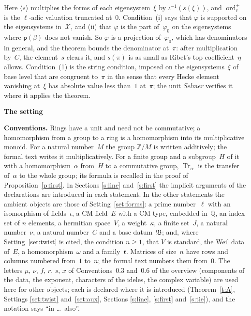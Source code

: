 \documentclass[11pt,a4paper]{article}
\newcommand{\m}[1]{\mbox{$#1$}}        %
\newcommand{\sect}[2]{\refstepcounter{section}\label{#2}\par\addvspace{19pt plus 4pt minus 2pt}\Needspace{7\baselineskip}%
  \noindent\llap{{\fontsize{13.2}{16}\selectfont\bfseries\color{inkfaint}\thesection}\hspace{9pt}}%
  {\fontsize{13.2}{16}\selectfont\bfseries\color{ink}#1}\par\nopagebreak\vspace{-1pt}}
\theoremstyle{plainx}
\theoremstyle{uprightx}
\newenvironment{conventions}{\par\addvspace{5pt}\noindent\textbf{Conventions.}\enspace\ignorespaces}{\par\addvspace{3pt}}
\newcommand{\ZZ}{\mathbb{Z}}
\newcommand{\Qbar}{\bar{\mathbb{Q}}}
\newcommand{\Tr}{\operatorname{Tr}}
\newcommand{\dg}[1]{\langle #1\rangle}
\newcommand{\ordp}{\operatorname{ord}^{+}_{\ell}}
\newcommand{\fB}{\mathfrak{B}}
\newcommand{\rr}{\mathfrak{r}}
\newcommand{\cX}{\mathcal{X}}
\begin{document}
Here \m{\dg{s}} multiplies the forms of each eigensystem~$\xi$ by \m{\iota^{-1}(s(\xi))}, and \m{\ordp} is the
$\ell$-adic valuation truncated at~$0$. Condition~(i) says that $\varphi$ is supported on the eigensystems
in~$\cX$, and (ii) that $\varphi$ is the part of~$\varphi_0$ on the eigensystems where \m{\mathsf{p}(\beta)} does not
vanish. So $\varphi$ is a projection of~$\varphi_0$, which has denominators in general, and the theorem bounds the
denominator at~$\pi$: after multiplication by~$C$, the element~$s$ clears it, and \m{s(\pi)} is as small as Ribet's
top coefficient~$\eta$ allows. Condition~(1) is the string condition, imposed on the eigensystems~$\xi$ of base
level that are congruent to~$\pi$ in the sense that every Hecke element vanishing at~$\xi$ has absolute value less
than~$1$ at~$\pi$; the unit \emph{Selmer} verifies it where it applies the theorem.

\sect{The setting}{s:setting}
\begin{conventions}\label{c:conventions}
Rings have a unit and need not be commutative; a homomorphism from a group to a ring is a homomorphism into its
multiplicative monoid. For a natural number~$M$ the group \m{\ZZ/M} is written additively; the formal text writes
it multiplicatively. For a finite group and a subgroup~$H$ of it with a homomorphism~$\alpha$ from~$H$ to a
commutative group, \m{\Tr_\alpha} is the transfer of~$\alpha$ to the whole group; its formula is recalled in the
proof of Proposition~\ref{p:first}. In Sections \ref{s:line} and~\ref{s:first} the implicit arguments of the
declarations are introduced in each statement. In the other statements the ambient objects are those of
Setting~\ref{set:forms}: a prime number~$\ell$ with an isomorphism of fields~$\iota$, a CM field~$E$ with a CM type,
embedded in~$\Qbar$, an index set of $n$ elements, a hermitian space~$V$, a weight~$\kappa$, a finite set~$J$, a
natural number~$\nu$, a natural number~$C$ and a base datum~$\fB$; and, where Setting~\ref{set:twist} is cited,
the condition \m{n\ge1}, that $V$ is standard, the Weil data of~$E$, a homomorphism~$\omega$ and a family~$\rr$.
Matrices of size~$n$ have rows and columns numbered from~$1$ to~$n$; the formal text numbers them from~$0$.
The letters $\mu$, $\nu$, $f$, $r$, $s$, $x$ of Conventions~0.3 and~0.6 of the overview (components of the data, the exponent,
characters of the ideles, the complex variable) are used here for other objects; each is declared where it is introduced
(Theorem~\ref{t:A}, Settings \ref{set:twist} and~\ref{set:aux}, Sections \ref{s:line}, \ref{s:first} and~\ref{s:tie}), and the
notation says ``in \dots\ also''.
\end{conventions}
\end{document}
